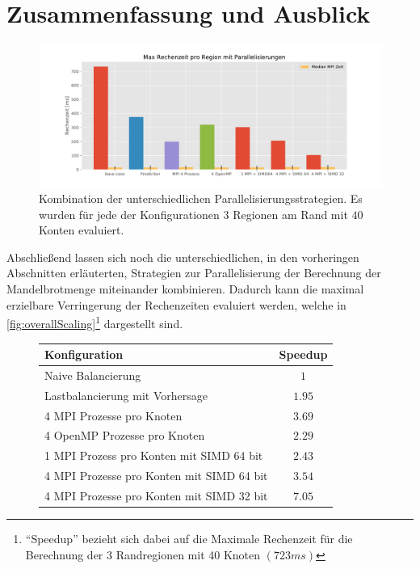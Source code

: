 \section{Zusammenfassung und Ausblick}

\begin{figure}
	\centering
	\includegraphics[width=0.9\linewidth]{img/Zusammenfassung/overall}
	\caption{Kombination der unterschiedlichen Parallelisierungsstrategien.
		Es wurden für jede der Konfigurationen \( 3 \) Regionen am Rand mit \( 40 \) Konten evaluiert.}
	\label{fig:overallScaling}
\end{figure}

Abschließend lassen sich noch die unterschiedlichen, in den vorheringen Abschnitten erläuterten,
Strategien zur Parallelisierung der Berechnung der Mandelbrotmenge miteinander kombinieren. Dadurch
kann die maximal erzielbare Verringerung der Rechenzeiten evaluiert werden, welche in \autoref{fig:overallScaling}\footnote{\enquote{Speedup} bezieht sich dabei auf
	die Maximale Rechenzeit für die Berechnung der 3 Randregionen mit 40 Knoten \( (723 ms) \)}
dargestellt sind.

\begin{figure}[h!]
	\centering
	\begin{tabular}{lc}
		Konfiguration                             & Speedup    \\
		\hline
		Naive Balancierung                        & \( 1 \)    \\
		Lastbalancierung mit Vorhersage           & \( 1.95 \) \\
		4 MPI Prozesse pro Knoten                 & \( 3.69 \) \\
		4 OpenMP Prozesse pro Knoten              & \( 2.29 \) \\
		1 MPI Prozess pro Konten mit SIMD 64 bit  & \( 2.43 \) \\
		4 MPI Prozesse pro Konten mit SIMD 64 bit & \( 3.54 \) \\
		4 MPI Prozesse pro Konten mit SIMD 32 bit & \( 7.05 \) \\
	\end{tabular}
\end{figure}

